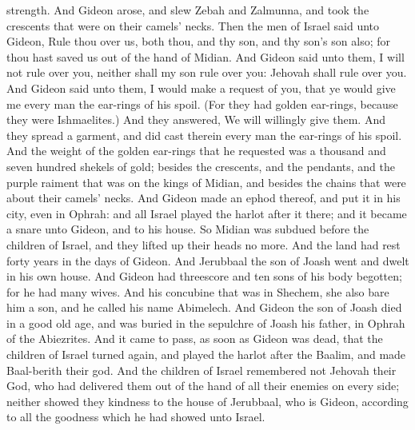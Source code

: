 strength. And Gideon arose, and slew Zebah and Zalmunna, and took the crescents that were on their camels’ necks.  Then the men of Israel said unto Gideon, Rule thou over us, both thou, and thy son, and thy son’s son also; for thou hast saved us out of the hand of Midian. And Gideon said unto them, I will not rule over you, neither shall my son rule over you: Jehovah shall rule over you. And Gideon said unto them, I would make a request of you, that ye would give me every man the ear-rings of his spoil. (For they had golden ear-rings, because they were Ishmaelites.) And they answered, We will willingly give them. And they spread a garment, and did cast therein every man the ear-rings of his spoil. And the weight of the golden ear-rings that he requested was a thousand and seven hundred shekels of gold; besides the crescents, and the pendants, and the purple raiment that was on the kings of Midian, and besides the chains that were about their camels’ necks. And Gideon made an ephod thereof, and put it in his city, even in Ophrah: and all Israel played the harlot after it there; and it became a snare unto Gideon, and to his house. So Midian was subdued before the children of Israel, and they lifted up their heads no more. And the land had rest forty years in the days of Gideon.  And Jerubbaal the son of Joash went and dwelt in his own house. And Gideon had threescore and ten sons of his body begotten; for he had many wives. And his concubine that was in Shechem, she also bare him a son, and he called his name Abimelech. And Gideon the son of Joash died in a good old age, and was buried in the sepulchre of Joash his father, in Ophrah of the Abiezrites.  And it came to pass, as soon as Gideon was dead, that the children of Israel turned again, and played the harlot after the Baalim, and made Baal-berith their god. And the children of Israel remembered not Jehovah their God, who had delivered them out of the hand of all their enemies on every side; neither showed they kindness to the house of Jerubbaal, who is Gideon, according to all the goodness which he had showed unto Israel. 

